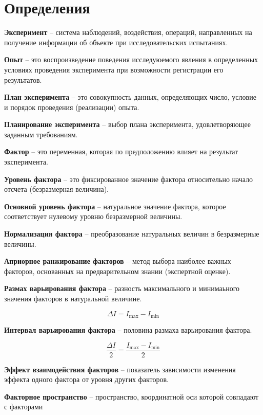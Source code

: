 \section{Определения}

\textbf{Эксперимент} -- система наблюдений, воздействия, операций, направленных на получение информации об объекте при исследовательских испытаниях.

\textbf{Опыт} -- это воспроизведение поведения исследуюемого явления в определенных условиях проведения эксперимента при возможности регистрации его результатов.

\textbf{План эксперимента} -- это совокупность данных, определяющих число, условие и порядок проведения (реализации) опыта.

\textbf{Планирование эксперимента} -- выбор плана эксперимента, удовлетворяющее заданным требованиям.

\textbf{Фактор} -- это переменная, которая по предположению влияет на результат эксперимента.

\textbf{Уровень фактора} -- это фиксированное значение фактора относительно начало отсчета (безразмерная величина).

\textbf{Основной уровень фактора} -- натуральное значение фактора, которое соответствует нулевому уровню безразмерной величины.

\textbf{Нормализация фактора} -- преобразование натуральных величин в безразмерные величины.

\textbf{Априорное ранжирование факторов} -- метод выбора наиболее важных факторов, основанных на предварительном знании (экспертной оценке).

\textbf{Размах варьирования фактора} -- разность максимального и минимаьного значения факторов в натуральной величине.

\begin{equation*}
    \Delta I = I_{\max} - I_{\min}
\end{equation*}

\textbf{Интервал варьирования фактора} -- половина размаха варьирования фактора.

\begin{equation*}
    \frac{\Delta I}{2} = \frac{I_{\max} - I_{\min}}{2}
\end{equation*}

\textbf{Эффект взаимодействия факторов} -- показатель зависимости изменения эффекта одного фактора от уровня других факторов.

\textbf{Факторное пространство} -- пространство, координатной оси которой совпадают с факторами

